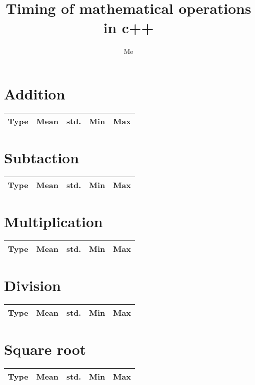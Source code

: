 \documentclass[a4paper]{article}
\title{Timing of mathematical operations in c++}
\author{Me}
\date{}
\begin{document}
  \maketitle

  \section{Addition}
  \begin{tabular}{||c|c|c|c|c||}
    \hline
    \textbf{Type}&\textbf{Mean}&\textbf{std.}&\textbf{Min}&\textbf{Max}\\
    \hline
    
    \hline
  \end{tabular}


  \section{Subtaction}
  \begin{tabular}{||c|c|c|c|c||}
    \hline
    \textbf{Type}&\textbf{Mean}&\textbf{std.}&\textbf{Min}&\textbf{Max}\\
    \hline
    
    \hline
  \end{tabular}


  \section{Multiplication}
  \begin{tabular}{||c|c|c|c|c||}
    \hline
    \textbf{Type}&\textbf{Mean}&\textbf{std.}&\textbf{Min}&\textbf{Max}\\
    \hline
    
    \hline
  \end{tabular}


  \section{Division}
  \begin{tabular}{||c|c|c|c|c||}
    \hline
    \textbf{Type}&\textbf{Mean}&\textbf{std.}&\textbf{Min}&\textbf{Max}\\
    \hline
    
    \hline
  \end{tabular}


  \section{Square root}
  \begin{tabular}{||c|c|c|c|c||}
    \hline
    \textbf{Type}&\textbf{Mean}&\textbf{std.}&\textbf{Min}&\textbf{Max}\\
    \hline
    
    \hline
  \end{tabular}
\end{document}

